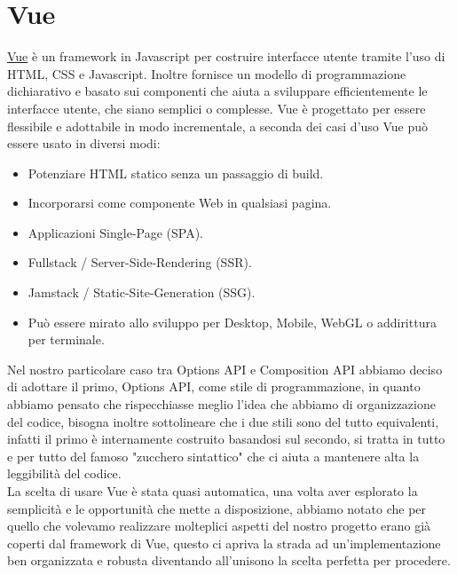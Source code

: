 \documentclass[a4paper,12pt]{report}
\newcommand{\vue}{\href{https://vuejs.org/}{Vue} }
\begin{document}
\section{Vue}
\vue è un framework in Javascript per costruire interfacce utente tramite l'uso di HTML, CSS e Javascript. Inoltre fornisce un modello di programmazione dichiarativo e basato sui componenti che aiuta a sviluppare efficientemente le interfacce utente, che siano semplici o complesse. Vue è progettato per essere flessibile e adottabile in modo incrementale, a seconda dei casi d'uso Vue può essere usato in diversi modi:
\begin{itemize}
	\item Potenziare HTML statico senza un passaggio di build.
	\item Incorporarsi come componente Web in qualsiasi pagina.
	\item Applicazioni Single-Page (SPA).
	\item Fullstack / Server-Side-Rendering (SSR).
	\item Jamstack / Static-Site-Generation (SSG).
	\item Può essere mirato allo sviluppo per Desktop, Mobile, WebGL o addirittura per terminale.
\end{itemize}
Nel nostro particolare caso tra Options API e Composition API abbiamo deciso di adottare il primo, Options API, come stile di programmazione, in quanto abbiamo pensato che rispecchiasse meglio l'idea che abbiamo di organizzazione del codice, bisogna inoltre sottolineare che i due stili sono del tutto equivalenti, infatti il primo è internamente costruito basandosi sul secondo, si tratta in tutto e per tutto del famoso "zucchero sintattico" che ci aiuta a mantenere alta la leggibilità del codice.\\
La scelta di usare Vue è stata quasi automatica, una volta aver esplorato la semplicità e le opportunità che mette a disposizione, abbiamo notato che per quello che volevamo realizzare molteplici aspetti del nostro progetto erano già coperti dal framework di Vue, questo ci apriva la strada ad un'implementazione ben organizzata e robusta diventando all'unisono la scelta perfetta per procedere.
\end{document}
